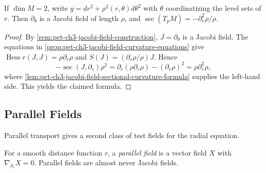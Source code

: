 \begin{example}
  \label{ex:pet-ch3-two-dim-sectional-curvature-formula}


  If $\dim M=2$, write $g=dr^2+\rho^2(r,\theta)d\theta^2$ with $\theta$
  coordinatizing the level sets of $r$. Then $\partial_\theta$ is a Jacobi field
  of length $\rho$, and $\sec(T_pM)=-\partial_r^2\rho/\rho$.
\end{example}
\begin{proof}

  \sketch
  By \cref{rem:pet-ch3-jacobi-field-construction},
  $J=\partial_\theta$ is a Jacobi field. The equations in
  \cref{prop:pet-ch3-jacobi-field-curvature-equations} give
  $\operatorname{Hess}r(J,J)=\rho\partial_r\rho$ and
  $S(J)=(\partial_r\rho/\rho)J$. Hence
  \[
   -\sec(J,\partial_r)\rho^2
   =\partial_r(\rho\partial_r\rho)-(\partial_r\rho)^2
   =\rho\partial_r^2\rho,
  \]
  where \cref{lem:pet-ch3-jacobi-field-sectional-curvature-formula} supplies the
  left-hand side. This yields the claimed formula.
\end{proof}

\subsection{Parallel Fields}

Parallel transport gives a second class of test fields for the radial equation.

\begin{definition}
  \label{def:pet-ch3-parallel-field}


  For a smooth distance function $r$, a \emph{parallel field} is a vector field
  $X$ with $\nabla_{\partial_r}X=0$. Parallel fields are almost never Jacobi
  fields.
\end{definition}

